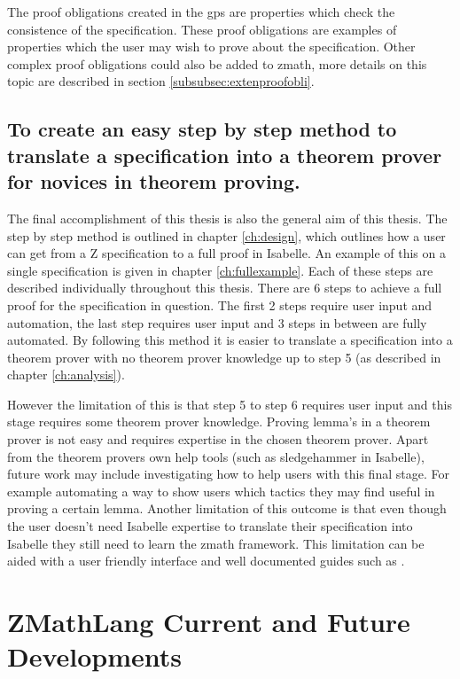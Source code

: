 The proof obligations created in the \gls{gps} are properties which check the
consistence of the specification. These proof obligations are examples of
properties which the user may wish to prove about the specification. Other
complex proof obligations could also be added to \gls{zmath}, more details on
this topic are described in section \ref{subsubsec:extenproofobli}.

\subsection{To create an easy step by step method to translate a specification into a theorem prover for novices in theorem proving.}

The final accomplishment of this thesis is also the general aim of this thesis.
The step by step method is outlined in chapter \ref{ch:design}, which outlines
how a user can get from a Z specification to a full proof in Isabelle. An
example of this on a single specification is given in chapter
\ref{ch:fullexample}. Each of these steps are described individually throughout
this thesis. There are 6 steps to achieve a full proof for the specification in
question. The first 2 steps require user input and automation, the last step
requires user input and 3 steps in between are fully automated. By following
this method it is easier to translate a specification into a theorem prover with
no theorem prover knowledge up to step 5 (as described in chapter
\ref{ch:analysis}).

However the limitation of this is that step 5 to step 6 requires user input and
this stage requires some theorem prover knowledge. Proving lemma's in a theorem
prover is not easy and requires expertise in the chosen theorem prover. Apart
from the theorem provers own help tools (such as sledgehammer in Isabelle),
future work may include investigating how to help users with this final stage.
For example automating a way to show users which tactics they may find useful in
proving a certain lemma. Another limitation of this outcome is that even though
the user doesn't need Isabelle expertise to translate their specification into
Isabelle they still need to learn the \gls{zmath} framework. This limitation can
be aided with a user friendly interface and well documented guides such as
\cite{zmathuser}.


\section{ZMathLang Current and Future Developments}
\label{sec:zmathcurandfut}

